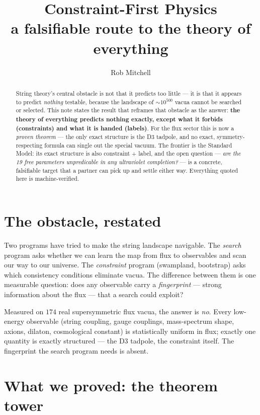 \documentclass[11pt]{article}
\title{\textcolor{accent}{Constraint-First Physics}\\ a falsifiable route to the theory of everything}
\author{Rob Mitchell}
\date{}
\begin{document}
\maketitle

\begin{abstract}
String theory's central obstacle is not that it predicts too little --- it is that it
appears to predict \emph{nothing} testable, because the landscape of $\sim10^{500}$
vacua cannot be searched or selected. This note states the result that reframes that
obstacle as the answer: \textbf{the theory of everything predicts nothing exactly,
except what it forbids (constraints) and what it is handed (labels)}. For the flux
sector this is now a \emph{proven theorem} --- the only exact structure is the D3
tadpole, and no exact, symmetry-respecting formula can single out the special vacuum. The
frontier is the Standard Model: its exact structure is also constraint + label, and
the open question --- \emph{are the 19 free parameters unpredicable in any
ultraviolet completion?} --- is a concrete, falsifiable target that a partner can pick
up and settle either way. Everything quoted here is machine-verified.
\end{abstract}

\section{The obstacle, restated}

Two programs have tried to make the string landscape navigable. The \emph{search}
program asks whether we can learn the map from flux to observables and scan our way to
our universe. The \emph{constraint} program (swampland, bootstrap) asks which
consistency conditions eliminate vacua. The difference between them is one measurable
question: does any observable carry a \emph{fingerprint} --- strong information about
the flux --- that a search could exploit?

Measured on $174$ real supersymmetric flux vacua, the answer is \emph{no}. Every
low-energy observable (string coupling, gauge couplings, mass-spectrum shape, axions,
dilaton, cosmological constant) is statistically uniform in flux; exactly one quantity
is exactly structured --- the D3 tadpole, the constraint itself. The fingerprint the
search program needs is absent.

\section{What we proved: the theorem tower}
\end{document}

